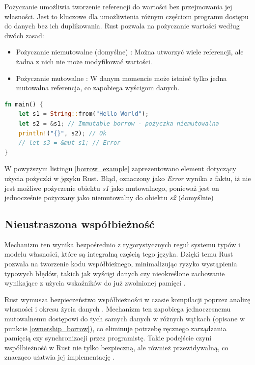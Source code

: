 Pożyczanie  umożliwia tworzenie referencji do wartości bez przejmowania jej własności. Jest to kluczowe dla umożliwienia różnym częściom programu dostępu do danych bez ich duplikowania. Rust pozwala na pożyczanie wartości według dwóch zasad:
\begin{itemize}
    \item Pożyczanie niemutowalne (domyślne) : Można utworzyć wiele referencji, ale żadna z nich nie może modyfikować wartości.
    \item Pożyczanie mutowalne : W danym momencie może istnieć tylko jedna mutowalna referencja, co zapobiega wyścigom danych.
\end{itemize}
\begin{lstlisting}[language=Rust,caption=Przykład mechanizmu borrow, label=borrow_example]
fn main() {
    let s1 = String::from("Hello World");
    let s2 = &s1; // Immutable borrow - pożyczka niemutowalna
    println!("{}", s2); // Ok
    // let s3 = &mut s1; // Error
}
\end{lstlisting}
W powyższym listingu \ref{borrow_example} zaprezentowano element dotyczący użycia pożyczki w języku Rust. Błąd, oznaczony jako \textit{Error} wynika z faktu, iż nie jest możliwe pożyczenie obiektu \textit{s1} jako mutowalnego, ponieważ jest on jednocześnie pożyczany jako niemutowalny do obiektu \textit{s2} (domyślnie)


\subsection{Nieustraszona współbieżność}
Mechanizm ten wynika bezpośrednio z rygorystycznych reguł systemu typów i modelu własności, które są integralną częścią tego języka. Dzięki temu Rust pozwala na tworzenie kodu współbieżnego, minimalizując ryzyko wystąpienia typowych błędów, takich jak wyścigi danych czy nieokreślone zachowanie wynikające z użycia wskaźników do już zwolnionej pamięci .

Rust wymusza bezpieczeństwo współbieżności w czasie kompilacji poprzez analizę własności i okresu życia danych . Mechanizm ten zapobiega jednoczesnemu mutowalnemu dostępowi do tych samych danych w różnych wątkach (opisane w punkcie \ref{ownership_borrow}), co eliminuje potrzebę ręcznego zarządzania pamięcią czy synchronizacji przez programistę. Takie podejście czyni współbieżność w Rust nie tylko bezpieczną, ale również przewidywalną, co znacząco ułatwia jej implementację \cite{RustFC}.

